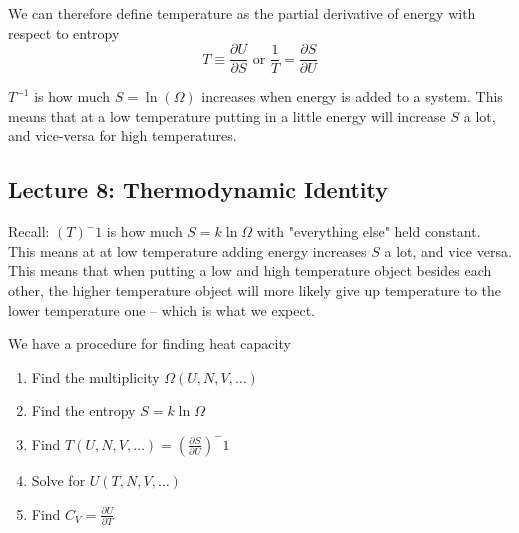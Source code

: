 \documentclass[10pt]{article}
\begin{document}
\begin{definition}
	We can therefore define temperature as the partial derivative of energy with respect to entropy
	\begin{equation}
		T \equiv \frac{\partial U}{\partial S}  \text{ or } \frac{1}{T} = \frac{\partial S}{\partial U} 
		\label{eq:294:temp_dfn_final}
	\end{equation}

	$ T^{-1} $  is how much $ S =\ln(\Omega) $ increases when energy is added to a system.
	This means that at a low temperature putting in a little energy will increase $ S $ a lot, and vice-versa for high temperatures.
\end{definition}


\subsection{Lecture 8: Thermodynamic Identity}

\begin{blockquote}
	Recall: $ (T)^-1 $  is how much $ S = k \ln{\Omega} $ with "everything else" held constant.
	This means at at low temperature adding energy increases $ S $ a lot, and vice versa. 
	This means that when putting a low and high temperature object besides each other, the higher temperature object will more likely give up temperature to the lower temperature one -- which is what we expect.
\end{blockquote}


We have a procedure for finding heat capacity
\begin{enumerate}
	\item Find the multiplicity $ \Omega(U, N, V, \ldots) $  
	\item Find the entropy $ S = k \ln \Omega   $ 
	\item Find $ T(U, N, V, \ldots) = (\frac{\partial S}{\partial U} )^-1 $ 
	\item Solve for $ U(T, N, V, \ldots) $ 
	\item Find $ C_V = \frac{\partial U}{\partial T}  $ 

\end{enumerate}
\end{document}
